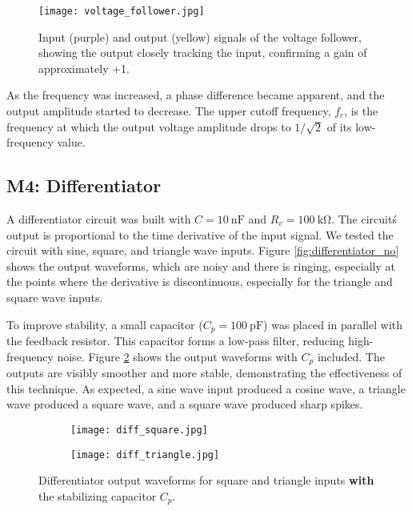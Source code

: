 \documentclass[12pt,a4paper]{article}
\begin{document}
\begin{figure}[H]
    \centering
    \texttt{[image: voltage\_follower.jpg]} 
    \caption{Input (purple) and output (yellow) signals of the voltage follower, showing the output closely tracking the input, confirming a gain of approximately +1.}
    \label{fig:follower_unity}
\end{figure}

As the frequency was increased, a phase difference became apparent, and the output amplitude started to decrease. The upper cutoff frequency, \(f_c\), is the frequency at which the output voltage amplitude drops to \(1/\sqrt{2}\) of its low-frequency value.


\subsection{M4: Differentiator}
A differentiator circuit was built with \(C = \SI{10}{\nano\farad}\) and \(R_v = \SI{100}{\kilo\ohm}\). The circuit\'s output is proportional to the time derivative of the input signal. We tested the circuit with sine, square, and triangle wave inputs. Figure \ref{fig:differentiator_no} shows the output waveforms, which are noisy and there is ringing, especially at the points where the derivative is discontinuous, especially for the triangle and square wave inputs. 

To improve stability, a small capacitor (\(C_p = \SI{100}{\pico\farad}\)) was placed in parallel with the feedback resistor. This capacitor forms a low-pass filter, reducing high-frequency noise. Figure \ref{fig:differentiator} shows the output waveforms with \(C_p\) included. The outputs are visibly smoother and more stable, demonstrating the effectiveness of this technique. As expected, a sine wave input produced a cosine wave, a triangle wave produced a square wave, and a square wave produced sharp spikes.

\begin{figure}[H]
    \centering
    \begin{subfigure}[b]{0.32\linewidth}
        \texttt{[image: diff\_square.jpg]} 
    \end{subfigure}
    \begin{subfigure}[b]{0.32\linewidth}
        \texttt{[image: diff\_triangle.jpg]} 
    \end{subfigure}
    \caption{Differentiator output waveforms for square and triangle inputs \textbf{with} the stabilizing capacitor \(C_p\).}
    \label{fig:differentiator}
\end{figure}
\end{document}
